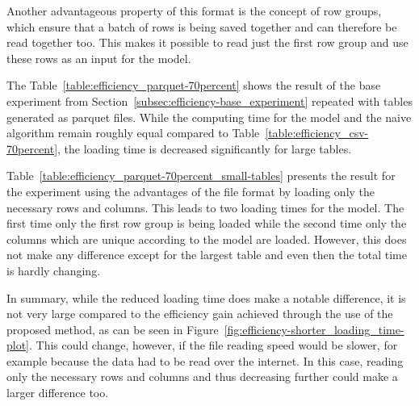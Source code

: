 Another advantageous property of this format is the concept of row groups, which ensure that a batch of rows is being saved together and can therefore be read together too. This makes it possible to read just the first row group and use these rows as an input for the model.

The Table~\ref{table:efficiency_parquet-70percent} shows the result of the base experiment from Section~\ref{subsec:efficiency-base_experiment} repeated with tables generated as parquet files. While the computing time for the model and the naive algorithm remain roughly equal compared to Table~\ref{table:efficiency_csv-70percent}, the loading time is decreased significantly for large tables. %



Table~\ref{table:efficiency_parquet-70percent_small-tables} presents the result for the experiment using the advantages of the file format by loading only the necessary rows and columns. This leads to two loading times for the model. The first time only the first row group is being loaded while the second time only the columns which are unique according to the model are loaded. However, this does not make any difference except for the largest table and even then the total time is hardly changing.



In summary, while the reduced loading time does make a notable difference, it is not very large compared to the efficiency gain achieved through the use of the proposed method, as can be seen in Figure~\ref{fig:efficiency-shorter_loading_time-plot}. This could change, however, if the file reading speed would be slower, for example because the data had to be read over the internet. In this case, reading only the necessary rows and columns and thus decreasing \io{} further could make a larger difference too.






